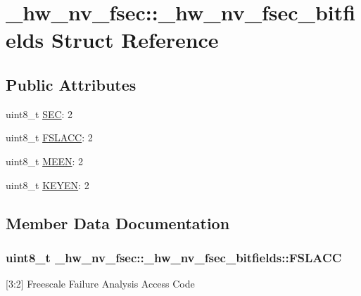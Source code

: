 \hypertarget{struct__hw__nv__fsec_1_1__hw__nv__fsec__bitfields}{}\section{\+\_\+hw\+\_\+nv\+\_\+fsec\+:\+:\+\_\+hw\+\_\+nv\+\_\+fsec\+\_\+bitfields Struct Reference}
\label{struct__hw__nv__fsec_1_1__hw__nv__fsec__bitfields}
\subsection*{Public Attributes}
\begin{DoxyCompactItemize}
\item 
uint8\+\_\+t \hyperlink{struct__hw__nv__fsec_1_1__hw__nv__fsec__bitfields_a12b270003398b0a38f7c6656b62b633f}{S\+EC}\+: 2
\item 
uint8\+\_\+t \hyperlink{struct__hw__nv__fsec_1_1__hw__nv__fsec__bitfields_a16d6d39f442b998805c485f95faee400}{F\+S\+L\+A\+CC}\+: 2
\item 
uint8\+\_\+t \hyperlink{struct__hw__nv__fsec_1_1__hw__nv__fsec__bitfields_abd59843058bc5e5527960a17b2ab1c21}{M\+E\+EN}\+: 2
\item 
uint8\+\_\+t \hyperlink{struct__hw__nv__fsec_1_1__hw__nv__fsec__bitfields_a6a7cc4a40532f6aaad6a080fa8e7aa6d}{K\+E\+Y\+EN}\+: 2
\end{DoxyCompactItemize}


\subsection{Member Data Documentation}
\subsubsection[{\texorpdfstring{F\+S\+L\+A\+CC}{FSLACC}}]{\setlength{\rightskip}{0pt plus 5cm}uint8\+\_\+t \+\_\+hw\+\_\+nv\+\_\+fsec\+::\+\_\+hw\+\_\+nv\+\_\+fsec\+\_\+bitfields\+::\+F\+S\+L\+A\+CC}\hypertarget{struct__hw__nv__fsec_1_1__hw__nv__fsec__bitfields_a16d6d39f442b998805c485f95faee400}{}\label{struct__hw__nv__fsec_1_1__hw__nv__fsec__bitfields_a16d6d39f442b998805c485f95faee400}
\mbox{[}3\+:2\mbox{]} Freescale Failure Analysis Access Code 
